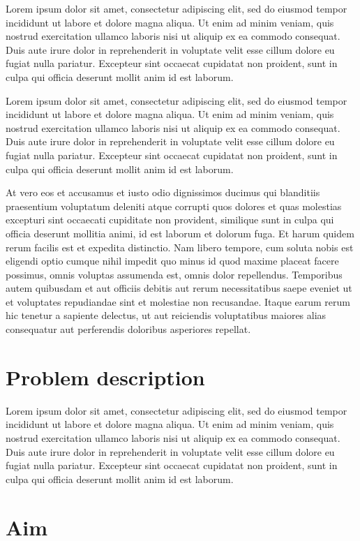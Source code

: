 \documentclass[11pt]{report}
\begin{document}
Lorem ipsum dolor sit amet, consectetur adipiscing elit, sed do eiusmod tempor incididunt ut labore et dolore magna aliqua. Ut enim ad minim veniam, quis nostrud exercitation ullamco laboris nisi ut aliquip ex ea commodo consequat. Duis aute irure dolor in reprehenderit in voluptate velit esse cillum dolore eu fugiat nulla pariatur. Excepteur sint occaecat cupidatat non proident, sunt in culpa qui officia deserunt mollit anim id est laborum.

Lorem ipsum dolor sit amet, consectetur adipiscing elit, sed do eiusmod tempor incididunt ut labore et dolore magna aliqua. Ut enim ad minim veniam, quis nostrud exercitation ullamco laboris nisi ut aliquip ex ea commodo consequat. Duis aute irure dolor in reprehenderit in voluptate velit esse cillum dolore eu fugiat nulla pariatur. Excepteur sint occaecat cupidatat non proident, sunt in culpa qui officia deserunt mollit anim id est laborum.

At vero eos et accusamus et iusto odio dignissimos ducimus qui blanditiis praesentium voluptatum deleniti atque corrupti quos dolores et quas molestias excepturi sint occaecati cupiditate non provident, similique sunt in culpa qui officia deserunt mollitia animi, id est laborum et dolorum fuga. Et harum quidem rerum facilis est et expedita distinctio. Nam libero tempore, cum soluta nobis est eligendi optio cumque nihil impedit quo minus id quod maxime placeat facere possimus, omnis voluptas assumenda est, omnis dolor repellendus. Temporibus autem quibusdam et aut officiis debitis aut rerum necessitatibus saepe eveniet ut et voluptates repudiandae sint et molestiae non recusandae. Itaque earum rerum hic tenetur a sapiente delectus, ut aut reiciendis voluptatibus maiores alias consequatur aut perferendis doloribus asperiores repellat.

\section{Problem description}

Lorem ipsum dolor sit amet, consectetur adipiscing elit, sed do eiusmod tempor incididunt ut labore et dolore magna aliqua. Ut enim ad minim veniam, quis nostrud exercitation ullamco laboris nisi ut aliquip ex ea commodo consequat. Duis aute irure dolor in reprehenderit in voluptate velit esse cillum dolore eu fugiat nulla pariatur. Excepteur sint occaecat cupidatat non proident, sunt in culpa qui officia deserunt mollit anim id est laborum.

\section{Aim}
\end{document}
